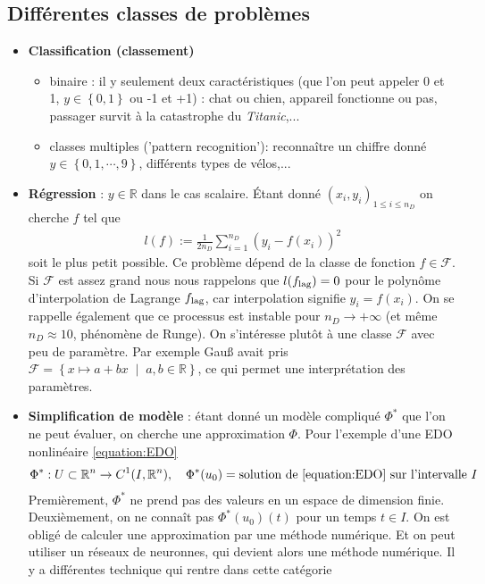 \documentclass[11pt,a4paper]{article}
\newcommand{\ndata}{n_D}
\newcommand{\R}{\mathbb R}
\newcommand{\Set}[1]{\left\{#1\right\}}
\newcommand{\SetDef}[2]{\left\{#1\;\middle|\;#2\right\}}
\begin{document}
\subsection{Différentes classes de problèmes}\label{subsec:}
%
\begin{itemize}
%
\item \textbf{Classification (classement)}
\begin{itemize}
\item binaire : il y seulement deux caractéristiques (que l'on peut appeler 0 et 1, $y\in\Set{0,1}$ ou -1 et +1) : chat ou chien, appareil fonctionne ou pas, passager survit à la catastrophe du \textit{Titanic},...
\item classes multiples ('pattern recognition'): reconnaître un chiffre donné $y\in\Set{0,1,\cdots,9}$, différents types de vélos,...
\end{itemize}
%
\item \textbf{Régression} : $y\in\R$ dans le cas scalaire. Étant donné $(x_i,y_i)_{1\le i\le \ndata}$ on cherche $f$ tel que
\begin{align*}
l(f) := \frac{1}{2\ndata}\sum_{i=1}^{\ndata}\left(y_i - f(x_i)\right)^2
\end{align*}
%
soit le plus petit possible. Ce problème dépend de la classe de fonction $f\in\mathcal F$. Si $\mathcal F$ est assez grand nous nous rappelons 
que $l(f_{\rm lag})=0$ pour le polynôme d'interpolation de Lagrange $f_{\rm lag}$, car interpolation signifie $y_i=f(x_i)$.
On se rappelle également que ce processus est instable pour $\ndata\to+\infty$ (et même $\ndata\approx 10$, phénomène de Runge).
%
On s'intéresse plutôt à une classe $\mathcal F$ avec peu de paramètre. Par exemple Gau{\ss} avait pris 
$\mathcal F=\SetDef{x\mapsto a + bx}{a,b\in\R}$, ce qui permet une interprétation des paramètres.
%
\item \textbf{Simplification de modèle} : étant donné un modèle compliqué $\Phi^*$ que l'on ne peut évaluer, on cherche une approximation $\Phi$. Pour l'exemple d'une EDO nonlinéaire \eqref{equation:EDO} 
\begin{align*}
\Phi^* : U\subset\R^n \to C^1(I, \R^n),\quad \Phi^*(u_0) = \mbox{solution de \eqref{equation:EDO} sur l'intervalle $I$}
\end{align*}
Premièrement, $\Phi^*$ ne prend pas des valeurs en un espace de dimension finie. Deuxièmement, on ne connaît pas $\Phi^*(u_0)(t)$ pour un temps $t\in I$. On est obligé de calculer une approximation par une méthode numérique. Et on peut utiliser un réseaux de neuronnes, qui devient alors une méthode numérique. Il y a différentes technique qui rentre dans cette catégorie

\end{itemize}
\end{document}
